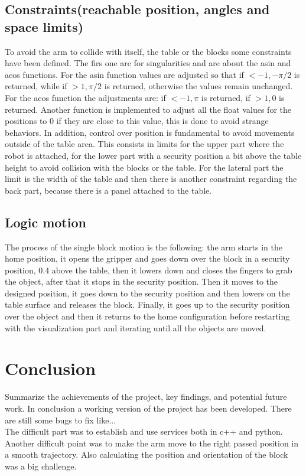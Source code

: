 \documentclass[12pt,a4paper]{article}
\begin{document}
\subsection{Constraints(reachable position, angles and space limits)}\label{subsec:constraints}
To avoid the arm to collide with itself, the table or the blocks some constraints have been defined. The firs one are for singularities and are about the asin and acos functions. For the asin function values are adjusted so that if $<-1, -\pi/2$ is returned, while if $>1, \pi/2$ is returned, otherwise the values remain unchanged. For the acos function the adjustments are: if $<-1, \pi$ is returned, if $>1, 0$ is returned. Another function is implemented to adjust all the float values for the positions to 0 if they are close to this value, this is done to avoid strange behaviors. In addition, control over position is fundamental to avoid movements outside of the table area. This consists in limits for the upper part where the robot is attached, for the lower part with a security position a bit above the table height to avoid collision with the blocks or the table. For the lateral part the limit is the width of the table and then there is another constraint regarding the back part, because there is a panel attached to the table.


\subsection{Logic motion}\label{subsec:logic}
The process of the single block motion is the following: the arm starts in the home position, it opens the gripper and goes down over the block in a security position, 0.4 above the table, then it lowers down and closes the fingers to grab the object, after that it stops in the security position. Then it moves to the designed position, it goes down to the security position and then lowers on the table surface and releases the block. Finally, it goes up to the security position over the object and then it returns to the home configuration before restarting with the visualization part and iterating until all the objects are moved.

\section{Conclusion}\label{sec:conclusion}
Summarize the achievements of the project, key findings, and potential future work. 
In conclusion a working version of the project has been developed. There are still some bugs to fix like...\\
The difficult part was to establish and use services both in c++ and python. Another difficult point was to make the arm move to the right passed position in a smooth trajectory. Also calculating the position and orientation of the block was a big challenge.
\end{document}
